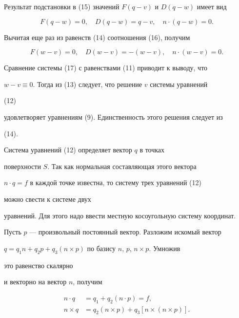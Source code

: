 \begin{pf}
\begin{equation}
\end{equation} 


Результат подстановки в (15) значений $F(q-v)$ и $D(q-w)$ имеет вид 


\begin{equation} 


F(q-w)=0,\quad D(q-w)=q-v,\quad n\cdot(q-w)=0. 


\end{equation} 


Вычитая еще раз из равенств (14) соотношения (16), получим 


\begin{equation} 


F(w-v)=0,\quad D(w-v)=-(w-v),\quad n\cdot(w-v)=0. 


\end{equation} 


 


Сравнение системы (17) с равенствами (11) приводит к выводу, что 


$w-v\equiv 0$. Тогда из (13) следует, что решение $v$ системы уравнений 


(12) 


удовлетворяет уравнениям (9). Единственность этого решения следует из 


(14). 


\end{pf}  


 


Система уравнений (12) определяет вектор $q$ в точках


поверхности $S$. Так как нормальная составляющая этого вектора 


$n\cdot q=f$ в каждой точке известна, то систему трех уравнений (12) 


можно свести к системе двух  


уравнений. Для этого надо ввести местную косоугольную систему координат. 


Пусть $p$ --- произвольный постоянный вектор. Разложим искомый вектор 


$q=q_1n+q_2p+q_3(n\times p)$ по базису $n$, $p$, $n\times p$. Умножив 


это равенство скалярно 


и векторно на вектор $n$, получим 


\begin{align} 


n\cdot q&=q_1+q_2(n\cdot p)=f,\\ 


n\times q&=q_2(n\times p)+q_3[n\times(n\times p)]. 


\end{align} 



